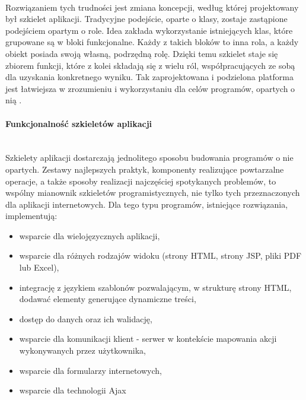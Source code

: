 	\\
	Rozwiązaniem tych trudności jest zmiana koncepcji, według której projektowany był szkielet aplikacji. Tradycyjne podejście, oparte o klasy, zostaje zastąpione podejściem opartym o role. Idea zakłada wykorzystanie istniejących klas, które grupowane są w bloki funkcjonalne. Każdy z takich bloków to inna rola, a każdy obiekt posiada swoją własną, podrzędną rolę. Dzięki temu szkielet staje się zbiorem funkcji, które z kolei składają się z wielu ról, współpracujących ze sobą dla uzyskania konkretnego wyniku. Tak zaprojektowana i podzielona platforma jest łatwiejsza w zrozumieniu i wykorzystaniu dla celów programów, opartych o nią \cite{framework_design_-_a_role_modeling_approach}.
	
\paragraph{Funkcjonalność szkieletów aplikacji} \hspace{0pt} \\
	Szkielety aplikacji dostarczają jednolitego sposobu budowania programów o nie opartych. Zestawy najlepszych praktyk, komponenty realizujące powtarzalne operacje, a także sposoby realizacji najczęściej spotykanych problemów, to wspólny mianownik szkieletów programistycznych, nie tylko tych przeznaczonych dla aplikacji internetowych. Dla tego typu programów, istniejące rozwiązania, implementują:
	\begin{itemize}
		\item wsparcie dla wielojęzycznych aplikacji,
		\item wsparcie dla różnych rodzajów widoku (strony HTML, strony JSP, pliki PDF lub Excel),
		\item integrację z językiem szablonów pozwalającym, w strukturę strony HTML, dodawać elementy generujące dynamiczne treści,
		\item dostęp do danych oraz ich walidację,
		\item wsparcie dla komunikacji klient - serwer w kontekście mapowania akcji wykonywanych przez użytkownika,
		\item wsparcie dla formularzy internetowych,
		\item wsparcie dla technologii Ajax
	\end{itemize}	
	
